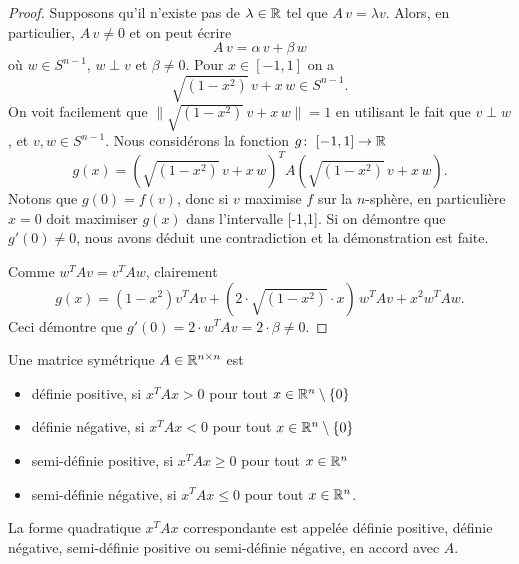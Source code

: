 \begin{proof}
  Supposons qu'il n'existe pas de $\lambda \in \mathbb{R}$  tel que $A\,v  =  \lambda v$. Alors,  en particulier, $A\, v \neq 0$ et on peut écrire 
  \begin{displaymath}
    A\,v = \alpha \, v + \beta \, w
  \end{displaymath}
où $w \in S^{n-1}$, $w \perp v$ et $\beta \neq 0$. Pour $x \in [-1,1]$ on a 
\begin{displaymath}
  \sqrt{(1 - x^2)} \,v + x\, w \in S^{n-1}.
\end{displaymath}On voit facilement que $\|\sqrt{(1 - x^2)} \,v + x\, w\|=1$ en utilisant le fait que $v\perp w$, et $v,w\in S^{n-1}$.
Nous considérons  la fonction $g\colon\; [-1,1] \rightarrow \mathbb{R}$ 
\begin{displaymath}
  g(x) = \left(\sqrt{(1 - x^2)} \,v + x\, w \right)^T A \left(\sqrt{(1 - x^2)} \,v + x\, w \right). 
\end{displaymath}
Notons que $g(0)=f(v)$, donc si $v$ maximise $f$ sur la $n$-sphère, en particulière $x=0$ doit maximiser $g(x)$ dans l'intervalle [-1,1]. Si on démontre que $g'(0) \neq 0$, nous avons déduit une contradiction et la démonstration est faite. 

Comme $w^TAv = v^TAw$, clairement 
\begin{displaymath}
  g(x) = (1-x^2) v^T A v + (2 \cdot \sqrt{(1 - x^2)} \cdot x) \, w^T A v + x^2 w^TAw.
\end{displaymath}
Ceci démontre que $g'(0) = 2 \cdot w^T A v = 2 \cdot \beta  \neq 0$. 

\end{proof}





\begin{definition}
  \label{def:f22}
  Une matrice symétrique $A \in \mathbb{R}^{n \times n}$ est 
  \begin{itemize}
  \item définie positive, si $x^TAx>0$ pour tout $x \in \mathbb{R}^n \setminus  \{0\}$ 
  \item définie négative, si $x^TAx<0$ pour tout $x \in \mathbb{R}^n \setminus  \{0\}$ 
  \item semi-définie positive, si $x^TAx\geq 0$ pour tout $x \in \mathbb{R}^n$ 
  \item semi-définie négative, si $x^TAx\leq 0$ pour tout $x \in \mathbb{R}^n$.  
  \end{itemize}
  La forme quadratique $x^TAx$ correspondante est appelée définie positive, définie négative, semi-définie positive ou semi-définie négative, en accord avec $A$. 
\end{definition}




